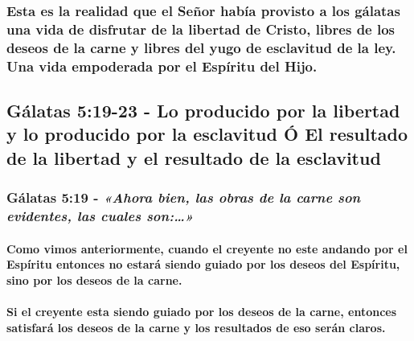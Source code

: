 \documentclass[11a pt,twoside]{article}
\newcommand{\scripture}[1]{%
  {\fontsize{12pt}{16pt}\selectfont\ScriptureFont\itshape #1}%
}
\let\oldsubsection\subsection
\renewcommand{\subsection}{\needspace{5\baselineskip}\oldsubsection}
\let\oldsubsubsection\subsubsection
\renewcommand{\subsubsection}{\needspace{4\baselineskip}\oldsubsubsection}
\let\oldparagraph\paragraph
\renewcommand{\paragraph}{\needspace{3\baselineskip}\oldparagraph}
\begin{document}
\subsubsection{Esta es la realidad que el Señor había provisto a los
gálatas una vida de disfrutar de la libertad de Cristo, libres de los
deseos de la carne y libres del yugo de esclavitud de la ley. Una vida
empoderada por el Espíritu del
Hijo.}\label{esta-es-la-realidad-que-el-seuxf1or-habuxeda-provisto-a-los-guxe1latas-una-vida-de-disfrutar-de-la-libertad-de-cristo-libres-de-los-deseos-de-la-carne-y-libres-del-yugo-de-esclavitud-de-la-ley.-una-vida-empoderada-por-el-espuxedritu-del-hijo.}

\subsection{Gálatas 5:19-23 - Lo producido por la libertad y lo
producido por la esclavitud Ó El resultado de la libertad y el resultado
de la
esclavitud}\label{guxe1latas-519-23---lo-producido-por-la-libertad-y-lo-producido-por-la-esclavitud-uxf3-el-resultado-de-la-libertad-y-el-resultado-de-la-esclavitud}

\subsubsection{\texorpdfstring{Gálatas 5:19 -
\scripture{«Ahora bien, las obras de la carne son evidentes, las cuales son:…»}}{Gálatas 5:19 - }}\label{guxe1latas-519---ahora-bien-las-obras-de-la-carne-son-evidentes-las-cuales-son}

\paragraph{Como vimos anteriormente, cuando el creyente no este andando
por el Espíritu entonces no estará siendo guiado por los deseos del
Espíritu, sino por los deseos de la
carne.}\label{como-vimos-anteriormente-cuando-el-creyente-no-este-andando-por-el-espuxedritu-entonces-no-estaruxe1-siendo-guiado-por-los-deseos-del-espuxedritu-sino-por-los-deseos-de-la-carne.}

\paragraph{Si el creyente esta siendo guiado por los deseos de la carne,
entonces satisfará los deseos de la carne y los resultados de eso serán
claros.}\label{si-el-creyente-esta-siendo-guiado-por-los-deseos-de-la-carne-entonces-satisfaruxe1-los-deseos-de-la-carne-y-los-resultados-de-eso-seruxe1n-claros.}
\end{document}
